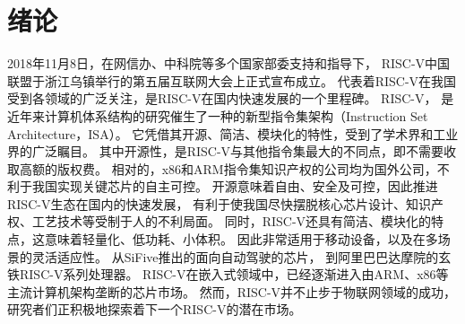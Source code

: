 \chapter{绪论}






2018年11月8日，在网信办、中科院等多个国家部委支持和指导下，
RISC-V中国联盟于浙江乌镇举行的第五届互联网大会上正式宣布成立。
代表着RISC-V在我国受到各领域的广泛关注，是RISC-V在国内快速发展的一个里程碑。
RISC-V\cite{asanovic2014instruction}，
是近年来计算机体系结构的研究催生了一种的新型指令集架构（Instruction Set Architecture，ISA）。
它凭借其开源、简洁、模块化的特性，受到了学术界和工业界的广泛瞩目。
其中开源性，是RISC-V与其他指令集最大的不同点，即不需要收取高额的版权费。
相对的，x86和ARM指令集知识产权的公司均为国外公司，不利于我国实现关键芯片的自主可控。
开源意味着自由、安全及可控，因此推进RISC-V生态在国内的快速发展，
有利于使我国尽快摆脱核心芯片设计、知识产权、工艺技术等受制于人的不利局面。
同时，RISC-V还具有简洁、模块化的特点，这意味着轻量化、低功耗、小体积。
因此非常适用于移动设备，以及在多场景的灵活适应性。
从SiFive推出的面向自动驾驶的芯片\cite{sifive-automotive}，
到阿里巴巴达摩院的玄铁RISC-V系列处理器\cite{xuantie}。
RISC-V在嵌入式领域中，已经逐渐进入由ARM、x86等主流计算机架构垄断的芯片市场。
然而，RISC-V并不止步于物联网领域的成功，研究者们正积极地探索着下一个RISC-V的潜在市场。

